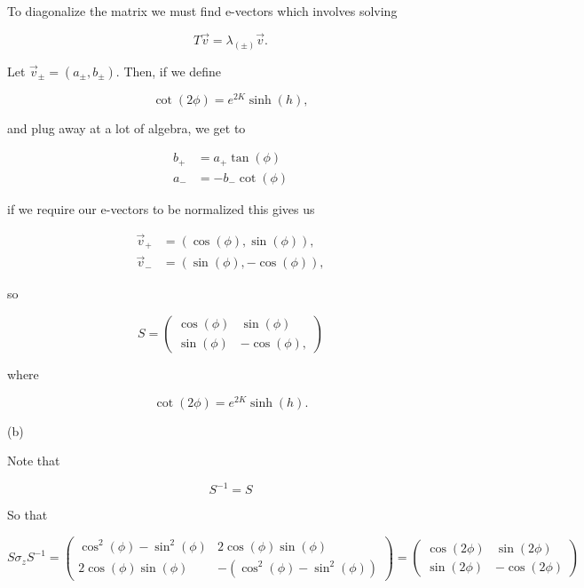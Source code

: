 \documentclass[12pt]{article}
\numberwithin{equation}{section}
\begin{document}
To diagonalize the matrix we must find e-vectors which involves solving 

\begin{equation}
    T \vec{v} = \lambda_{(\pm)}\vec{v}.
\end{equation}

Let $\vec{v}_{\pm} = (a_{\pm}, b_{\pm})$. Then, if we define 

\begin{equation}
    \cot(2\phi) = e^{2K}\sinh(h), 
\end{equation}

and plug away at a lot of algebra, we get to 

\begin{equation}
    \begin{aligned}
        b_+ &= a_+ \tan(\phi) \\ 
        a_- &= -b_- \cot(\phi)
    \end{aligned}
\end{equation}

if we require our e-vectors to be normalized this gives us 

\begin{equation}
    \begin{aligned}
        \vec{v}_+ &= (\cos(\phi), \sin(\phi)), \\
        \vec{v}_- &= (\sin(\phi), -\cos(\phi)),
    \end{aligned}
\end{equation}

so 

\begin{equation}
    S = \left(\begin{matrix}
        \cos(\phi) & \sin(\phi) \\
        \sin(\phi) & -\cos(\phi),
    \end{matrix}\right)
\end{equation}

where 

\begin{equation}
    \cot(2\phi) = e^{2K}\sinh(h).
\end{equation}

(b)

Note that 

\begin{equation}
    S^{-1} = S
\end{equation}

So that 

\begin{equation}
    S\sigma_zS^{-1} = \left(\begin{matrix}
        \cos^2(\phi) - \sin^2(\phi) & 2\cos(\phi)\sin(\phi) \\
        2\cos(\phi)\sin(\phi) & -(\cos^2(\phi) - \sin^2(\phi))
    \end{matrix}\right) = \left(\begin{matrix}
        \cos(2\phi) & \sin(2\phi) \\
        \sin(2\phi) & -\cos(2\phi)
    \end{matrix}\right)
\end{equation}
\end{document}
